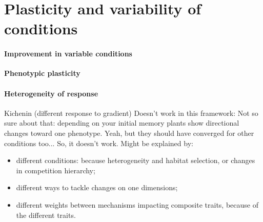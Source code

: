 \section{Plasticity and variability of conditions}

\paragraph{Improvement in variable conditions}

\textbf{Phenotypic plasticity }

\paragraph{Heterogeneity of response}

Kichenin (different response to gradient) Doesn't work in this framework: Not so sure about that: depending on your initial memory plants show directional changes toward one phenotype. Yeah, but they should have converged for other conditions too... So, it doesn't work. Might be explained by:
\begin{itemize}
\item different conditions: because heterogeneity and habitat selection, or changes in competition hierarchy;
\item different ways to tackle changes on one dimensions;
\item different weights between mechanisms impacting composite traits, because of the different traits.
\end{itemize}


